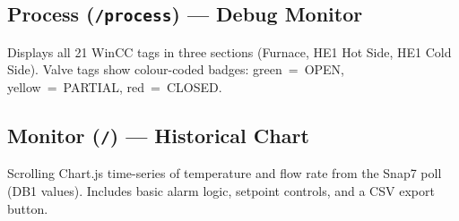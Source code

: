 \subsection{Process (\texttt{/process}) --- Debug Monitor}

Displays all 21 WinCC tags in three sections (Furnace, HE1 Hot Side, HE1 Cold Side).
Valve tags show colour-coded badges: green~=~OPEN, yellow~=~PARTIAL, red~=~CLOSED.

\subsection{Monitor (\texttt{/}) --- Historical Chart}

Scrolling Chart.js time-series of temperature and flow rate from the Snap7 poll (DB1
values). Includes basic alarm logic, setpoint controls, and a CSV export button.
